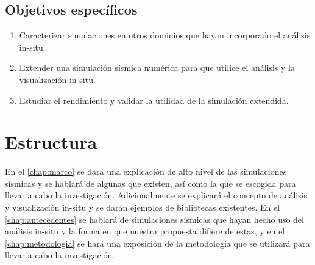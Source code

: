 \subsection{Objetivos específicos}
\begin{enumerate}
  \item Caracterizar simulaciones en otros dominios que hayan incorporado el análisis in-situ. %
  \item Extender una simulación sísmica numérica para que utilice el análisis y la visualización in-situ. %
  \item Estudiar el rendimiento y validar la utilidad de la simulación extendida. %
\end{enumerate}
\section{Estructura}
En el \cref{chap:marco} se dará una explicación de alto nivel de las simulaciones sísmicas y se hablará de algunas que existen, así como la que se escogida para llevar a cabo la investigación. Adicionalmente se explicará el concepto de análisis y visualización in-situ y se darán ejemplos de bibliotecas existentes.
En el \cref{chap:antecedentes} se hablará de simulaciones sísmicas que hayan hecho uso del análisis in-situ y la forma en que nuestra propuesta difiere de estas, y en el \cref{chap:metodologia} se hará una exposición de la metodología que se utilizará para llevar a cabo la investigación.


